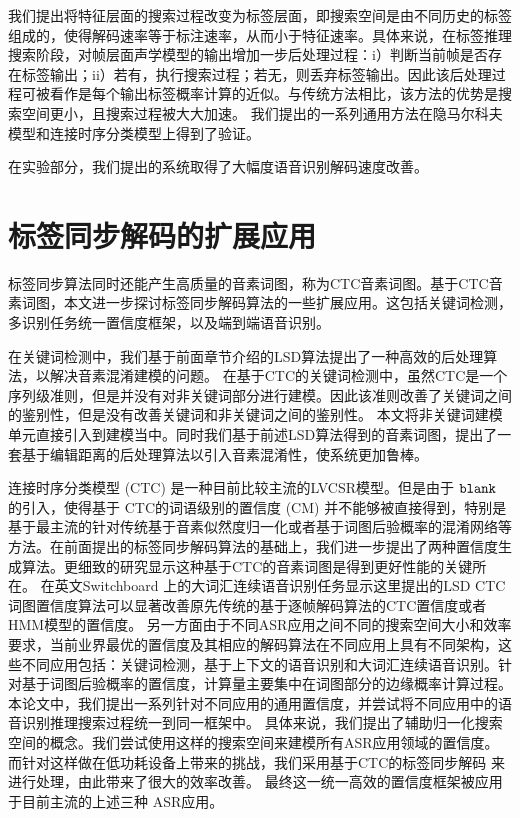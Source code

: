 我们提出将特征层面的搜索过程改变为标签层面，即搜索空间是由不同历史的标签组成的，使得解码速率等于标注速率，从而小于特征速率。具体来说，在标签推理搜索阶段，对帧层面声学模型的输出增加一步后处理过程：i）判断当前帧是否存在标签输出；ii）若有，执行搜索过程；若无，则丢弃标签输出。因此该后处理过程可被看作是每个输出标签概率计算的近似。与传统方法相比，该方法的优势是搜索空间更小，且搜索过程被大大加速。
我们提出的一系列通用方法在隐马尔科夫模型和连接时序分类模型上得到了验证。
%

在实验部分，我们提出的系统取得了大幅度语音识别解码速度改善。


\section{标签同步解码的扩展应用}
\label{chap:sum-unify}
标签同步算法同时还能产生高质量的音素词图，称为CTC音素词图。基于CTC音素词图，本文进一步探讨标签同步解码算法的一些扩展应用。这包括关键词检测，多识别任务统一置信度框架，以及端到端语音识别。

在关键词检测中，我们基于前面章节介绍的LSD算法提出了一种高效的后处理算法，以解决音素混淆建模的问题。
在基于CTC的关键词检测中，虽然CTC是一个序列级准则，但是并没有对非关键词部分进行建模。因此该准则改善了关键词之间的鉴别性，但是没有改善关键词和非关键词之间的鉴别性。
本文将非关键词建模单元直接引入到建模当中。同时我们基于前述LSD算法得到的音素词图，提出了一套基于编辑距离的后处理算法以引入音素混淆性，使系统更加鲁棒。

连接时序分类模型 (CTC) 是一种目前比较主流的LVCSR模型。但是由于 $\tt blank$ 的引入，使得基于 CTC的词语级别的置信度 (CM) 并不能够被直接得到，特别是基于最主流的针对传统基于音素似然度归一化或者基于词图后验概率的混淆网络等方法。在前面提出的标签同步解码算法的基础上，我们进一步提出了两种置信度生成算法。更细致的研究显示这种基于CTC的音素词图是得到更好性能的关键所在。
在英文Switchboard 上的大词汇连续语音识别任务显示这里提出的LSD CTC 词图置信度算法可以显著改善原先传统的基于逐帧解码算法的CTC置信度或者 HMM模型的置信度。
%
另一方面由于不同ASR应用之间不同的搜索空间大小和效率要求，当前业界最优的置信度及其相应的解码算法在不同应用上具有不同架构，这些不同应用包括：关键词检测，基于上下文的语音识别和大词汇连续语音识别。针对基于词图后验概率的置信度，计算量主要集中在词图部分的边缘概率计算过程。本论文中，我们提出一系列针对不同应用的通用置信度，并尝试将不同应用中的语音识别推理搜索过程统一到同一框架中。
%
具体来说，我们提出了辅助归一化搜索空间的概念。我们尝试使用这样的搜索空间来建模所有ASR应用领域的置信度。 %
而针对这样做在低功耗设备上带来的挑战，我们采用基于CTC的标签同步解码\cite{Chen+2016} 来进行处理，由此带来了很大的效率改善。
最终这一统一高效的置信度框架被应用于目前主流的上述三种 ASR应用。

